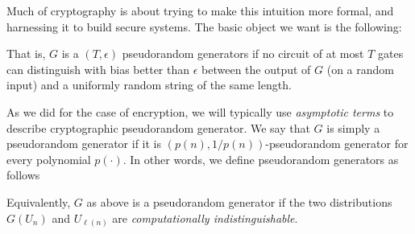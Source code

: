 Much of cryptography is about trying to make this intuition more formal,
and harnessing it to build secure systems. The basic object we want is
the following:

\hypertarget{prgdefconcrete}{}

That is, \(G\) is a \((T,\epsilon)\) pseudorandom generators if no
circuit of at most \(T\) gates can distinguish with bias better than
\(\epsilon\) between the output of \(G\) (on a random input) and a
uniformly random string of the same length.

As we did for the case of encryption, we will typically use
\emph{asymptotic terms} to describe cryptographic pseudorandom
generator. We say that \(G\) is simply a pseudorandom generator if it is
\((p(n),1/p(n))\)-pseudorandom generator for every polynomial
\(p(\cdot)\). In other words, we define pseudorandom generators as
follows

\hypertarget{prgdef}{}

Equivalently, \(G\) as above is a pseudorandom generator if the two
distributions \(G(U_n)\) and \(U_{\ell(n)}\) are \emph{computationally
indistinguishable}.

